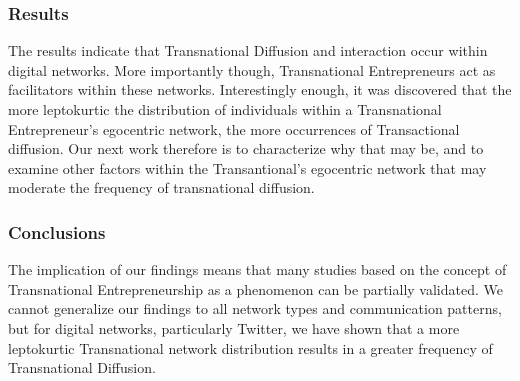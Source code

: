 \subsubsection{Results}
The results indicate that Transnational Diffusion and interaction
occur within digital networks. More importantly though, Transnational
Entrepreneurs act as facilitators within these networks. Interestingly
enough, it was discovered that the more leptokurtic the distribution
of individuals within a Transnational Entrepreneur's egocentric
network, the more occurrences of Transactional diffusion. Our next work
therefore is to characterize why that may be, and to examine other
factors within the Transantional's egocentric network that may
moderate the frequency of transnational diffusion.

\subsubsection{Conclusions}
The implication of our findings means that many studies based on the
concept of Transnational Entrepreneurship as a phenomenon can be
partially validated. We cannot generalize our findings to all network
types and communication patterns, but for digital networks,
particularly Twitter, we have shown that a more leptokurtic
Transnational network distribution results in a greater frequency of
Transnational Diffusion.
